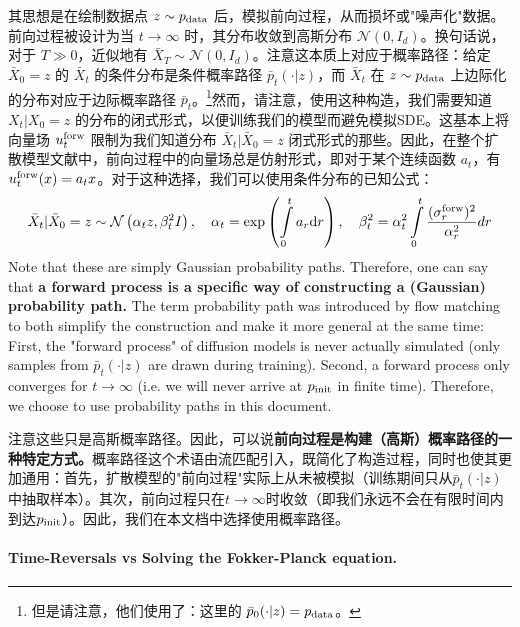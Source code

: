 其思想是在绘制数据点 $z\sim p_{\rm{data}}$ 后，模拟前向过程，从而损坏或"噪声化"数据。前向过程被设计为当 $t\to \infty$ 时，其分布收敛到高斯分布 $\mathcal{N}(0,I_d)$。换句话说，对于 $T\gg 0$，近似地有 $\bar{X}_{T}\sim\mathcal{N}(0,I_d)$。注意这本质上对应于概率路径：给定 $\bar{X}_0=z$ 的 $\bar{X}_t$ 的条件分布是条件概率路径 $\bar{p}_t(\cdot|z)$，而 $\bar{X}_t$ 在 $z\sim p_{\rm{data}}$ 上边际化的分布对应于边际概率路径 $\bar{p}_t$。\footnote{但是请注意，他们使用了：这里的 $\bar{p}_0(\cdot|z)=p_{\rm{data}}$。}然而，请注意，使用这种构造，我们需要知道 $X_t|X_0=z$ 的分布的闭式形式，以便训练我们的模型而避免模拟SDE。这基本上将向量场 $u^{\text{forw}}_t$ 限制为我们知道分布 $\bar{X}_t|\bar{X}_0=z$ 闭式形式的那些。因此，在整个扩散模型文献中，前向过程中的向量场总是仿射形式，即对于某个连续函数 $a_t$，有 $u^{\text{forw}}_t(x)=a_t x$。对于这种选择，我们可以使用条件分布的已知公式\citep{sarkka2019applied,song2021sde, karras2022elucidating}：
\begin{align*}
\bar{X}_t|\bar{X}_0=z\sim\mathcal{N}\left(\alpha_t z,\beta_t^2 I\right),\quad\alpha_t=\exp\left (\int\limits_{0}^{t}a_r\mathrm{d} r\right ),\quad\beta_t^2=\alpha_t^2\int\limits_{0}^{t}\frac{(\sigma^{\text{forw}}_r)^2}{\alpha^2_r}dr
\end{align*}
Note that these are simply Gaussian probability paths. Therefore, one can say that \textbf{a forward process is a specific way of constructing a (Gaussian) probability path.} The term probability path was introduced by flow matching \citep{lipman2022flow} to both simplify the construction and make it more general at the same time: First, the "forward process" of diffusion models is never actually simulated (only samples from $\bar{p}_t(\cdot|z)$ are drawn during training). Second, a forward process only converges for $t\to\infty$ (i.e. we will never arrive at $p_{\rm{init}}$ in finite time). Therefore, we choose to use probability paths in this document.

注意这些只是高斯概率路径。因此，可以说\textbf{前向过程是构建（高斯）概率路径的一种特定方式。}概率路径这个术语由流匹配\citep{lipman2022flow}引入，既简化了构造过程，同时也使其更加通用：首先，扩散模型的"前向过程"实际上从未被模拟（训练期间只从$\bar{p}_t(\cdot|z)$中抽取样本）。其次，前向过程只在$t\to\infty$时收敛（即我们永远不会在有限时间内到达$p_{\rm{init}}$）。因此，我们在本文档中选择使用概率路径。

\paragraph{Time-Reversals vs Solving the Fokker-Planck equation.}

